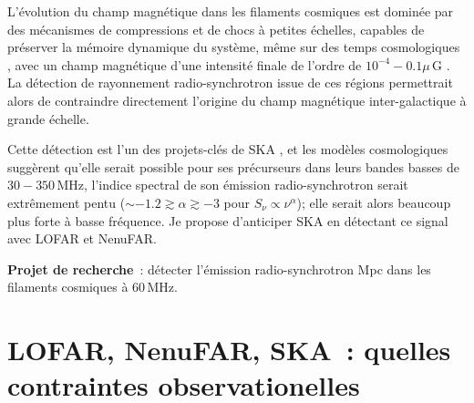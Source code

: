\pg
L'\'evolution du champ magn\'etique dans les filaments cosmiques est domin\'ee par des m\'ecanismes de compressions et de chocs \`a petites \'echelles, capables de pr\'eserver la m\'emoire dynamique du syst\`eme, m\^eme sur des temps cosmologiques \cite{2008Sci...320..909R, 2016arXiv160207526V}, avec un champ magn\'etique d'une intensit\'e finale de l'ordre de $10^{-4} - 0.1 \mu$\,G \cite{1999A&A...348..351D, 2005ApJ...631L..21B, 2003PhRvD..68d3002S, 2008Sci...320..909R, 2009ApJ...698L..14X, 2009MNRAS.392.1008D,2015MNRAS.453.3999M}. La d\'etection de rayonnement radio-synchrotron issue de ces r\'egions permettrait alors de contraindre directement l'origine du champ magn\'etique inter-galactique \`a grande \'echelle.

\pg
Cette d\'etection est l'un des projets-cl\'es de SKA \cite{2020Galax...8...53H}, et les mod\`eles cosmologiques sugg\`erent qu'elle serait possible pour ses pr\'ecurseurs \cite{2015A&A...580A.119V} dans leurs bandes basses de $30-350$\,MHz, l'indice spectral de son \'emission radio-synchrotron serait extr\^emement pentu ($\sim -1.2 \gtrsim \alpha  \gtrsim -3$ pour $S_\nu \propto \nu^\alpha$); elle serait alors beaucoup plus forte \`a basse fr\'equence. Je propose d'anticiper SKA en d\'etectant ce signal avec LOFAR et NenuFAR.%

\begin{tcolorbox}[colback=green!10, colframe=green!50!black, arc=3mm, boxrule=1pt]
	\textbf{Projet de recherche}~: d\'etecter l'\'emission radio-synchrotron Mpc dans les filaments cosmiques \`a 60\,MHz. 
\end{tcolorbox}

\section{LOFAR, NenuFAR, SKA~: quelles contraintes observationelles}

